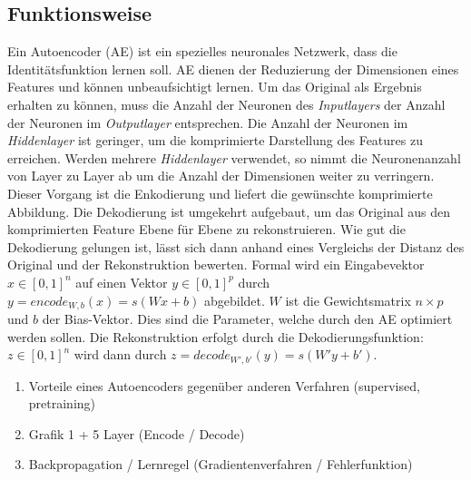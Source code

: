 \subsection{Funktionsweise}
Ein Autoencoder (AE) ist ein spezielles neuronales Netzwerk, dass die Identitätsfunktion lernen soll. AE dienen der Reduzierung der Dimensionen eines Features und können unbeaufsichtigt lernen. Um das Original als Ergebnis erhalten zu können, muss die Anzahl der Neuronen des \textit{Inputlayers} der Anzahl der Neuronen im \textit{Outputlayer} entsprechen. Die Anzahl der Neuronen im \textit{Hiddenlayer} ist geringer, um die komprimierte Darstellung des Features zu erreichen. Werden mehrere \textit{Hiddenlayer} verwendet, so nimmt die Neuronenanzahl von Layer zu Layer ab um die Anzahl der Dimensionen weiter zu verringern. Dieser Vorgang ist die Enkodierung und liefert die gewünschte komprimierte Abbildung. Die Dekodierung ist umgekehrt aufgebaut, um das Original aus den komprimierten Feature Ebene für Ebene zu rekonstruieren. Wie gut die Dekodierung gelungen ist, lässt sich dann anhand eines Vergleichs der Distanz des Original und der Rekonstruktion bewerten. Formal wird ein Eingabevektor $x \in [0,1]^n$ auf einen Vektor $y \in [0,1]^p$ durch $y = encode_{W,b}(x) = s(Wx + b)$ abgebildet. $W$ ist die Gewichtsmatrix $n \times p$ und $b$ der Bias-Vektor. Dies sind die Parameter, welche durch den AE optimiert werden sollen. Die Rekonstruktion erfolgt durch die Dekodierungsfunktion:$z \in [0, 1]^n$ wird dann durch $z = decode_{W', b'}(y) = s(W'y + b')$.

\begin{enumerate}
	\item Vorteile eines Autoencoders gegenüber anderen Verfahren (supervised, pretraining)
	\item Grafik 1 + 5 Layer (Encode / Decode)
	\item Backpropagation / Lernregel (Gradientenverfahren / Fehlerfunktion)
\end{enumerate}

